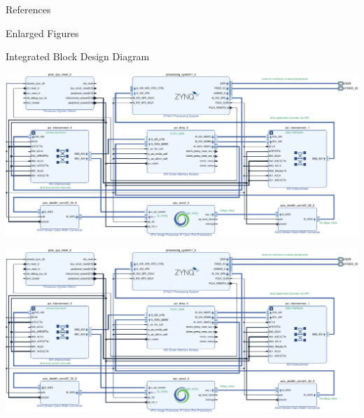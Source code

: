 \documentclass{matthijs}
\begin{document}
	\begin{hoofdstuk}{References}

		\printbibliography[heading=none]

	\end{hoofdstuk}

	\begin{appendices}
		\begin{hoofdstuk}{Enlarged Figures}
			\begin{paragraaf}{Integrated Block Design Diagram}
				\vspace{0.25cm}
				\centerline{\includegraphics[angle=90, origin=c, clip, trim=9.45cm 0 0 0, width=1.25\textwidth]{hw-block-diagram-crop-asset.pdf}}
				\clearpage
				\centerline{\includegraphics[angle=90, origin=c, clip, trim=0 0 9.45cm 0, width=1.25\textwidth]{hw-block-diagram-crop-asset.pdf}}
			\end{paragraaf}
		\end{hoofdstuk}
	\end{appendices}

	\clearpage
	\thispagestyle{empty}
	\addtocounter{page}{-1}
	\
	\clearpage
\end{document}
